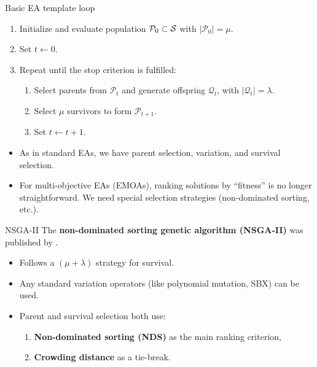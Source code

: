 \documentclass[11pt,compress,t,notes=noshow,xcolor=table]{beamer}
\begin{document}
\begin{framev}{Basic EA template loop}
\begin{algorithm}[H]
\caption{Basic EA template loop}
\begin{enumerate}
\item Initialize and evaluate population $\mathcal{P}_0 \subset \S$ with $|\mathcal{P}_0| = \mu$.
\item Set $t \gets 0$.
\item Repeat until the stop criterion is fulfilled:
\begin{enumerate}
\item Select parents from $\mathcal{P}_t$ and generate offspring $\mathcal{Q}_t$, with $|\mathcal{Q}_t| = \lambda$.
\item Select $\mu$ survivors to form $\mathcal{P}_{t+1}$.
\item Set $t \gets t + 1$.
\end{enumerate}
\end{enumerate}
\end{algorithm}
\vfill
\begin{itemize}
\item As in standard EAs, we have parent selection, variation, and survival selection.
\item For multi-objective EAs (EMOAs), ranking solutions by ``fitness'' is no longer straightforward. We need special selection strategies (non-dominated sorting, etc.).
\end{itemize}
\end{framev}


\begin{framev}{NSGA-II}
The \textbf{non-dominated sorting genetic algorithm (NSGA-II)} was published by
.
\spacer
\begin{itemize}
\item Follows a $(\mu + \lambda)$ strategy for survival.
\item Any standard variation operators (like polynomial mutation, SBX) can be used.
\item Parent and survival selection both use:
\begin{enumerate}
\item \textbf{Non-dominated sorting (NDS)} as the main ranking criterion,
\item \textbf{Crowding distance} as a tie-break.
\end{enumerate}
\end{itemize}
\end{framev}
\end{document}

